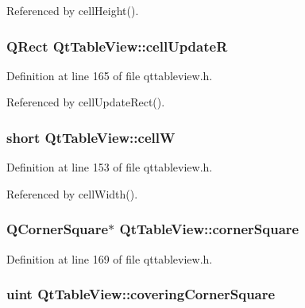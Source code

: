 Referenced by cell\+Height().

\hypertarget{classQtTableView_ad89f794e7afcf6fa828ca5facfdcb0c7}{
\subsubsection[{cell\+Update\+R}]{\setlength{\rightskip}{0pt plus 5cm}Q\+Rect Qt\+Table\+View\+::cell\+Update\+R\hspace{0.3cm}{\ttfamily [private]}}}\label{classQtTableView_ad89f794e7afcf6fa828ca5facfdcb0c7}


Definition at line 165 of file qttableview.\+h.



Referenced by cell\+Update\+Rect().

\hypertarget{classQtTableView_a89c6ba272703249e1b9ed1966805bbb6}{
\subsubsection[{cell\+W}]{\setlength{\rightskip}{0pt plus 5cm}short Qt\+Table\+View\+::cell\+W\hspace{0.3cm}{\ttfamily [private]}}}\label{classQtTableView_a89c6ba272703249e1b9ed1966805bbb6}


Definition at line 153 of file qttableview.\+h.



Referenced by cell\+Width().

\hypertarget{classQtTableView_a475408d4700629f39a517049a2409945}{
\subsubsection[{corner\+Square}]{\setlength{\rightskip}{0pt plus 5cm}Q\+Corner\+Square$\ast$ Qt\+Table\+View\+::corner\+Square\hspace{0.3cm}{\ttfamily [private]}}}\label{classQtTableView_a475408d4700629f39a517049a2409945}


Definition at line 169 of file qttableview.\+h.

\hypertarget{classQtTableView_af921747f43ca21feb16045c66b393da6}{
\subsubsection[{covering\+Corner\+Square}]{\setlength{\rightskip}{0pt plus 5cm}uint Qt\+Table\+View\+::covering\+Corner\+Square\hspace{0.3cm}{\ttfamily [private]}}}\label{classQtTableView_af921747f43ca21feb16045c66b393da6}


